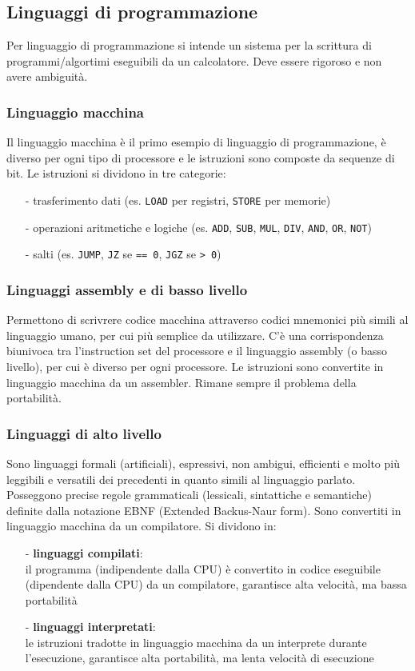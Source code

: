 \documentclass[a4paper]{article}
\begin{document}
\subsection{Linguaggi di programmazione}
Per linguaggio di programmazione si intende un sistema per la scrittura di programmi/algortimi eseguibili da un calcolatore.
Deve essere rigoroso e non avere ambiguità.

\subsubsection*{Linguaggio macchina}
Il linguaggio macchina è il primo esempio di linguaggio di programmazione, è diverso per ogni tipo di processore e le
istruzioni sono composte da sequenze di bit. Le istruzioni si dividono in tre categorie:
\begin{itemize}[topsep=3pt, itemsep=0pt]
	\item[-] trasferimento dati (es. \verb|LOAD| per registri, \verb|STORE| per memorie)
	\item[-] operazioni aritmetiche e logiche (es. \verb|ADD|, \verb|SUB|, \verb|MUL|, \verb|DIV|, \verb|AND|, \verb|OR|, \verb|NOT|)
	\item[-] salti (es. \verb|JUMP|, \verb|JZ| se \verb|== 0|, \verb|JGZ| se \verb|> 0|)
\end{itemize}

\subsubsection*{Linguaggi assembly e di basso livello}
Permettono di scrivrere codice macchina attraverso codici mnemonici più simili al linguaggio umano, per cui più semplice
da utilizzare. C'è una corrispondenza biunivoca tra l'instruction set del processore e il linguaggio assembly (o basso
livello), per cui è diverso per ogni processore. Le istruzioni sono convertite in linguaggio macchina da un assembler.
Rimane sempre il problema della portabilità.

\subsubsection*{Linguaggi di alto livello}
Sono linguaggi formali (artificiali), espressivi, non ambigui, efficienti e molto più leggibili e versatili dei precedenti
in quanto simili al linguaggio parlato. Posseggono precise regole grammaticali (lessicali, sintattiche e semantiche) definite
dalla notazione EBNF (Extended Backus-Naur form). Sono convertiti in linguaggio macchina da un compilatore. Si dividono in:
\begin{itemize}[topsep=3pt, itemsep=0pt]
	\item[-] \textbf{linguaggi compilati}: \\
	il programma (indipendente dalla CPU) è convertito in codice eseguibile (dipendente dalla CPU) da un compilatore,
	garantisce alta velocità, ma bassa portabilità
	\item[-] \textbf{linguaggi interpretati}: \\
	le istruzioni tradotte in linguaggio macchina da un interprete durante l'esecuzione, garantisce alta portabilità,
	ma lenta velocità di esecuzione
\end{itemize}
\end{document}
